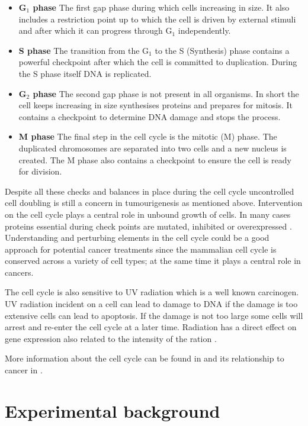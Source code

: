 \begin{itemize}
\item {\bf G$_1$ phase} The first gap phase during which cells increasing in size. It also includes a restriction point up to which the cell is driven by external stimuli and after which it can progress through G$_1$ independently. 
\item {\bf S phase} The transition from the G$_1$ to the S (Synthesis) phase contains a powerful checkpoint after which the cell is committed to duplication. During the S phase itself DNA is replicated.
\item {\bf G$_2$ phase} The second gap phase is not present in all organisms. In short the cell keeps increasing in size synthesises proteins and prepares for mitosis. It contains a checkpoint to determine DNA damage and stops the process. 
\item {\bf M phase} The final step in the cell cycle is the mitotic (M) phase. The duplicated chromosomes are separated into two cells and a new nucleus is created. The M phase also contains a checkpoint to ensure the cell is ready for division.
\end{itemize}

Despite all these checks and balances in place during the cell cycle uncontrolled cell doubling is still a concern in tumourigenesis as mentioned above. Intervention on the cell cycle plays a central role in unbound growth of cells. In many cases proteins essential during check points are mutated, inhibited or overexpressed \citep{Williams:2012eg}. Understanding and perturbing elements in the cell cycle could be a good approach for potential cancer treatments since the mammalian cell cycle is conserved across a variety of cell types; at the same time it plays a central role in cancers. 

The cell cycle is also sensitive to UV radiation which is a well known carcinogen. UV radiation incident on a cell can lead to damage to DNA if the damage is too extensive cells can lead to apoptosis. If the damage is not too large some cells will arrest and re-enter the cell cycle at a later time. Radiation has a direct effect on gene expression also related to the intensity of the ration \citep{Gentile:2003in}. 

More information about the cell cycle can be found in \cite[Chapter~17]{Alberts:2007tv} and its relationship to cancer in \cite[Chapter~8]{Weinberg:2013uu}.


\section{Experimental background}
\label{sec:exper-backgr}

